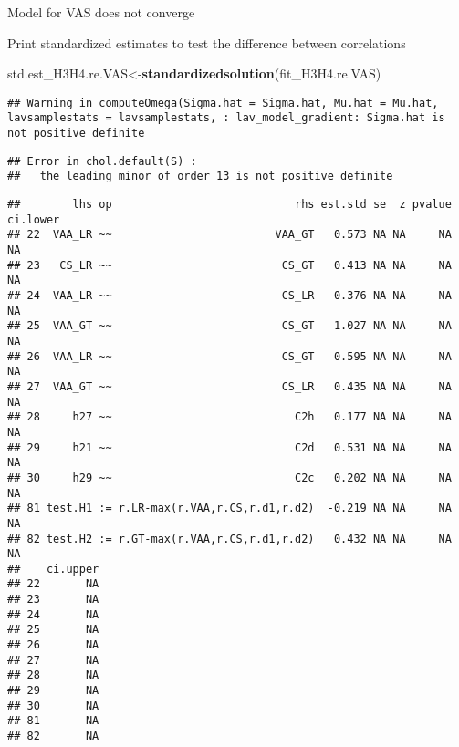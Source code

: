 \documentclass[
]{article}
\newenvironment{Shaded}{\begin{snugshade}}{\end{snugshade}}
\newcommand{\KeywordTok}[1]{\textcolor[rgb]{0.13,0.29,0.53}{\textbf{#1}}}
\newcommand{\NormalTok}[1]{#1}
\newcommand{\OperatorTok}[1]{\textcolor[rgb]{0.81,0.36,0.00}{\textbf{#1}}}
\newcommand{\StringTok}[1]{\textcolor[rgb]{0.31,0.60,0.02}{#1}}
\begin{document}
Model for VAS does not converge

Print standardized estimates to test the difference between correlations

\begin{Shaded}
\begin{Highlighting}[]
\NormalTok{std.est_H3H4.re.VAS<-}\KeywordTok{standardizedsolution}\NormalTok{(fit_H3H4.re.VAS)}
\end{Highlighting}
\end{Shaded}

\begin{verbatim}
## Warning in computeOmega(Sigma.hat = Sigma.hat, Mu.hat = Mu.hat, lavsamplestats = lavsamplestats, : lav_model_gradient: Sigma.hat is not positive definite
\end{verbatim}

\begin{verbatim}
## Error in chol.default(S) : 
##   the leading minor of order 13 is not positive definite
\end{verbatim}

\begin{Shaded}
\end{Shaded}

\begin{verbatim}
##        lhs op                            rhs est.std se  z pvalue ci.lower
## 22  VAA_LR ~~                         VAA_GT   0.573 NA NA     NA       NA
## 23   CS_LR ~~                          CS_GT   0.413 NA NA     NA       NA
## 24  VAA_LR ~~                          CS_LR   0.376 NA NA     NA       NA
## 25  VAA_GT ~~                          CS_GT   1.027 NA NA     NA       NA
## 26  VAA_LR ~~                          CS_GT   0.595 NA NA     NA       NA
## 27  VAA_GT ~~                          CS_LR   0.435 NA NA     NA       NA
## 28     h27 ~~                            C2h   0.177 NA NA     NA       NA
## 29     h21 ~~                            C2d   0.531 NA NA     NA       NA
## 30     h29 ~~                            C2c   0.202 NA NA     NA       NA
## 81 test.H1 := r.LR-max(r.VAA,r.CS,r.d1,r.d2)  -0.219 NA NA     NA       NA
## 82 test.H2 := r.GT-max(r.VAA,r.CS,r.d1,r.d2)   0.432 NA NA     NA       NA
##    ci.upper
## 22       NA
## 23       NA
## 24       NA
## 25       NA
## 26       NA
## 27       NA
## 28       NA
## 29       NA
## 30       NA
## 81       NA
## 82       NA
\end{verbatim}
\end{document}
